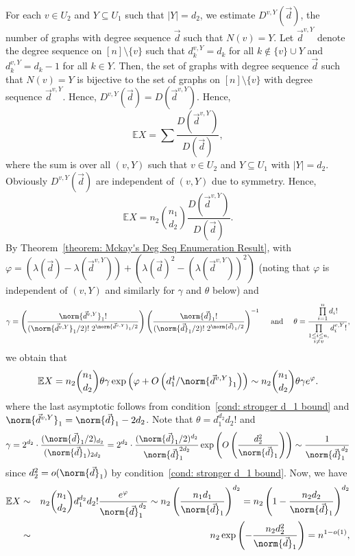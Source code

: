 \documentclass[12pt]{article}
\def\ex{{\mathbb E}}
\begin{document}
For each $v\in U_2$ and $Y\subseteq U_1$ such that $|Y|=d_2$, we estimate $D^{v,Y}(\vec{d})$, the number of graphs with degree sequence $\vec{d}$ such that $N(v)=Y$. Let $\vec{d}^{v,Y}$ denote the degree sequence on $[n]\setminus \{v\}$ such that $d^{v,Y}_k = d_k$ for all $k\notin \{v\}\cup Y$ and $d^{v,Y}_k = d_k - 1$ for all $k\in Y$. Then, the set of graphs with degree sequence $\vec{d}$ such that $N(v)=Y$ is bijective to the set of graphs on $[n]\setminus \{v\}$ with degree sequence $\vec{d}^{v,Y}$. Hence, $D^{v,Y}(\vec{d})=D(\vec{d}^{v,Y})$.
Hence,
\[
    \ex{X} = \sum\frac{D(\vec{d}^{v,Y})}{D(\vec{d})},
    \]
where the sum is over all $(v,Y)$ such that 
$v\in U_2$ and $Y\subseteq U_1$ with $|Y|=d_2$.
Obviously $D^{v,Y}(\vec{d})$ are independent of $(v,Y)$ due to symmetry. Hence,
\[    
    \ex{X} = n_2\binom{n_1}{d_2} \frac{D(\vec{d}^{v,Y})}{D(\vec{d})}.
\]
By Theorem~\ref{theorem: Mckay's Deg Seq Enumeration Result}, with  $\varphi = (\lambda(\vec{d}) - \lambda(\vec{d}^{v,Y})) + (\lambda(\vec{d})^2 - (\lambda(\vec{d}^{v,Y}))^2)$ (noting that $\varphi$ is independent of $(v,Y)$ and similarly for $\gamma$ and $\theta$ below) and
\[
\gamma= \left(\frac{\norm{\vec{d}^{v,Y}}_1!}{(\norm{\vec{d}^{v,Y}}_1/2)!\hspace{1mm} 2^{\norm{\vec{d}^{v,Y}}_1/2} }\right)\left(\frac{\norm{\vec{d}}_1!}{(\norm{\vec{d}}_1/2)!\hspace{1mm} 2^{\norm{\vec{d}}_1/2}}\right)^{-1} \quad\text{ and }\quad \theta = \frac{\prod\limits_{i = 1}^{n} d_i!}{\prod\limits_{\substack{1\leq i\leq n,\\ i\neq v}} d^{v,Y}_i!},
\]    
we obtain that    
    \[\ex{X} =  n_2\binom{n_1}{d_2}\theta \gamma\exp\left(\varphi + O\left(d_1^4/\norm{\vec{d}^{v,Y}}_1\right)\right)\sim n_2\binom{n_1}{d_2}\theta\gamma e^{\varphi}.
\]
where the last asymptotic follows from condition~\ref{cond: stronger d_1 bound} and $\norm{\vec{d}^{v,Y}}_1 = \norm{\vec{d}}_1 - 2d_2$. Note that $\theta = d_1^{d_2} d_2!$ and
\[
\gamma = 2^{d_2}\cdot\frac{(\norm{\vec{d}}_1/2)_{d_2}}{(\norm{\vec{d}}_1)_{2d_2}} = 2^{d_2}\cdot\frac{(\norm{\vec{d}}_1/2)^{d_2}}{\norm{\vec{d}}_1^{2d_2}}\exp\left(O\left(\frac{d_2^2}{\norm{\vec{d}}_1}\right)\right)\sim\frac{1}{\norm{\vec{d}}_1^{d_2}}
\]
since $d_2^2 = o(\norm{\vec{d}}_1)$ by condition~\ref{cond: stronger d_1 bound}.
Now, we have
\begin{eqnarray*}
\ex{X} &\sim &n_2\binom{n_1}{d_2} d_1^{d_2}d_2!\frac{e^{\varphi}}{\norm{\vec{d}}_1^{d_2}} \sim n_2\left(\frac{n_1 d_1}{\norm{\vec{d}}_1}\right)^{d_2} = n_2\left(1 - \frac{n_2 d_2}{\norm{\vec{d}}_1}\right)^{d_2}\\
&\sim& n_2\exp\left(-\frac{n_2 d_2^2}{\norm{\vec{d}}_1}\right) = n^{1-o(1)},
\end{eqnarray*}
\end{document}
